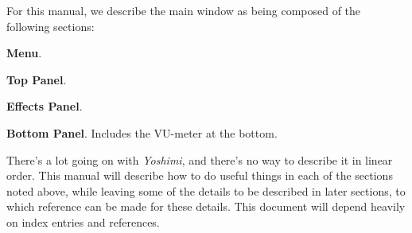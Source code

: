 \documentclass[
 11pt,
 twoside,
 a4paper,
 headinclude,
 footinclude,
 final                                 %
]{article}
\begin{document}
   For this manual, we describe the main window as being composed of
   the following sections:

\begin{enumber}
   \item \textbf{Menu}.
   \item \textbf{Top Panel}.
   \item \textbf{Effects Panel}.
   \item \textbf{Bottom Panel}.  Includes the VU-meter at the bottom.
\end{enumber}

There's a lot going on with \textsl{Yoshimi}, and there's no way
to describe it in linear order.  This manual will describe how to do useful
things in each of the sections noted above, while leaving some of the
details to be described in later sections, to which reference can be made
for these details.  This document will depend heavily on index entries and
references.




































\end{document}
